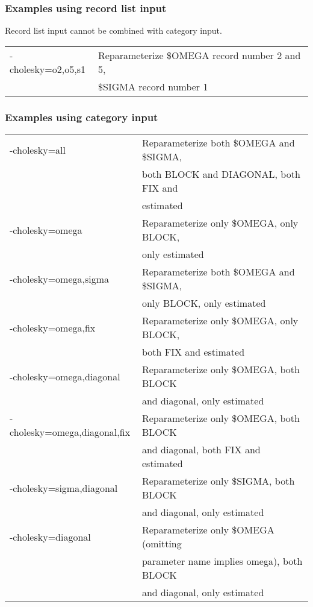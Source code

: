 \subsubsection*{Examples using record list input}
Record list input cannot be combined with category input.\\
\begin{tabular}{ll}
	-cholesky=o2,o5,s1 &               Reparameterize \$OMEGA record number 2 and 5,\\
     &  \$SIGMA record number 1\\
\end{tabular}

\subsubsection*{Examples using category input}
\begin{tabular}{ll}
	-cholesky=all &                Reparameterize both \$OMEGA and \$SIGMA,\\
     & both BLOCK and DIAGONAL, both FIX and\\
     &  estimated\\
	-cholesky=omega &              Reparameterize only \$OMEGA, only BLOCK,\\
     & only estimated\\
	-cholesky=omega,sigma &              Reparameterize both \$OMEGA and \$SIGMA,\\
     &  only BLOCK, only estimated\\
	-cholesky=omega,fix &          Reparameterize only \$OMEGA, only BLOCK,\\
      &  both FIX and estimated\\
	-cholesky=omega,diagonal &     Reparameterize only \$OMEGA, both BLOCK\\
       &  and diagonal, only estimated\\
	-cholesky=omega,diagonal,fix & Reparameterize only \$OMEGA, both BLOCK\\
  &  and diagonal, both FIX and estimated\\
	-cholesky=sigma,diagonal &     Reparameterize only \$SIGMA, both BLOCK\\
      &  and diagonal, only estimated\\
	-cholesky=diagonal  &          Reparameterize only \$OMEGA (omitting\\
      &  parameter name implies omega), both BLOCK\\
       &  and diagonal, only estimated \\
\end{tabular}


